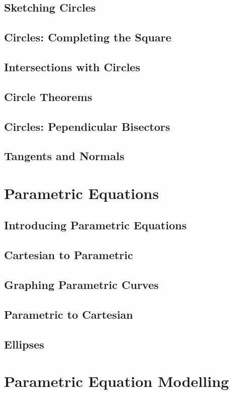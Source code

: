 \documentclass[../alevelmaths.tex]{subfiles}
\begin{document}
\subsection*{Sketching Circles}
\subsection*{Circles: Completing the Square}
\subsection*{Intersections with Circles}
\subsection*{Circle Theorems}
\subsection*{Circles: Pependicular Bisectors}
\subsection*{Tangents and Normals}
\section{Parametric Equations}
\subsection*{Introducing Parametric Equations}
\subsection*{Cartesian to Parametric}
\subsection*{Graphing Parametric Curves}
\subsection*{Parametric to Cartesian}
\subsection*{Ellipses}
\section{Parametric Equation Modelling}
\end{document}
